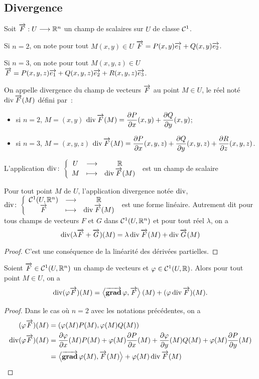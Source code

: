 \subsection{Divergence}

Soit \(\overrightarrow{F} : U \longrightarrow \mathbb{R}^n\) un champ de scalaires sur \(U\) de classe \(\mathcal{C}^{1}\).

Si \(n=2\), on note pour tout \(M(x,y) \in U\) \(\overrightarrow{F}=P(x,y)\overrightarrow{e_1} + Q(x,y)\overrightarrow{e_2}\).

Si \(n=3\), on note pour tout \(M(x,y,z) \in U\) \(\overrightarrow{F}=P(x,y,z)\overrightarrow{e_1} + Q(x,y,z)\overrightarrow{e_2}+R(x,y,z)\overrightarrow{e_3}\).

\begin{defdef}
  On appelle divergence du champ de vecteurs \(\overrightarrow{F}\) au point \(M \in U\), le réel noté \(\operatorname{div} \overrightarrow{F}(M)\) défini par~:
  \begin{itemize}
  \item si \(n=2\), \(M=(x,y)\) \(\operatorname{div} \overrightarrow{F}(M)=\dfrac{\partial{} P}{\partial{} x}(x,y) + \dfrac{\partial{} Q}{\partial{} y}(x,y)\);
  \item si \(n=3\), \(M=(x,y,z)\) \(\operatorname{div} \overrightarrow{F}(M)=\dfrac{\partial{} P}{\partial{} x}(x,y,z) + \dfrac{\partial{} Q}{\partial{} y}(x,y,z) + \dfrac{\partial{} R}{\partial{} z}(x,y,z)\).
  \end{itemize}
  L'application \(\operatorname{div}\colon \left\{\begin{array}{ccc} U & \longrightarrow &\mathbb{R}\\ M & \longmapsto & \operatorname{div} \overrightarrow{F}(M) \end{array} \right.\) est un champ de scalaire
\end{defdef}
%
\begin{prop}
  Pour tout point \(M\) de \(U\), l'application divergence notée \(\operatorname{div}\), \(\operatorname{div}\colon \left\{\begin{array}{ccc} \mathcal{C}^{1}(U, \mathbb{R}^n) & \longrightarrow &\mathbb{R}\\ \overrightarrow{F} & \longmapsto & \operatorname{div}\overrightarrow{F}(M) \end{array} \right.\) est une forme linéaire. Autrement dit pour tous champs de vecteurs \(F\) et \(G\) dans \(\mathcal{C}^{1}(U, \mathbb{R}^n)\) et pour tout réel \(\lambda\), on a
  \begin{equation}
    \operatorname{div}(\lambda \overrightarrow{F} + \overrightarrow{G})(M) = \lambda \operatorname{div} \overrightarrow{F}(M) + \operatorname{div} \overrightarrow{G}(M)
  \end{equation}
\end{prop}
\begin{proof}
  C'est une conséquence de la linéarité des dérivées partielles.
\end{proof}
%
\begin{prop}
  Soient \(\overrightarrow{F} \in \mathcal{C}^{1}(U, \mathbb{R}^n)\) un champ de vecteurs et \(\varphi \in \mathcal{C}^{1}(U, \mathbb{R})\). Alors pour tout point \(M \in U\), on a
  \begin{equation}
    \operatorname{div}(\varphi \overrightarrow{F})(M)=\left\langle{\operatorname{\overrightarrow{\mathbf{grad}}}{\varphi}},{\overrightarrow{F}}\right\rangle(M) + (\varphi \operatorname{div} \overrightarrow{F})(M).
  \end{equation}
\end{prop}
\begin{proof}
  Dans le cas où \(n=2\) avec les notations précédentes, on a
  \begin{align}
    (\varphi \overrightarrow{F})(M)& = (\varphi(M) P(M), \varphi(M) Q(M)) \\
    \operatorname{div}(\varphi \overrightarrow{F})(M)& = \dfrac{\partial{} \varphi}{\partial{} x}(M)  P(M) + \varphi(M) \dfrac{\partial{} P}{\partial{} x}(M) + \dfrac{\partial{} \varphi}{\partial{} y}(M)  Q(M) + \varphi(M) \dfrac{\partial{} P}{\partial{} y}(M) \\
    &=\left\langle{\operatorname{\overrightarrow{\mathbf{grad}}}{\varphi}(M)},{\overrightarrow{F}(M)}\right\rangle + \varphi(M)\operatorname{div}\overrightarrow{F}(M)
  \end{align}
\end{proof}

